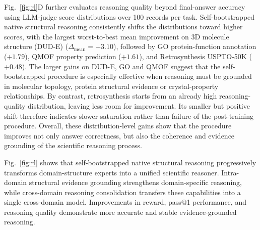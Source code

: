 Fig.~\ref{fig:rl}D further evaluates reasoning quality beyond final-answer accuracy using LLM-judge score distributions over 100 records per task. Self-bootstrapped native structural reasoning consistently shifts the distributions toward higher scores, with the largest worst-to-best mean improvement on 3D molecule structure (DUD-E) ($\Delta_{\mathrm{mean}}=+3.10$), followed by GO protein-function annotation ($+1.79$), QMOF property prediction ($+1.61$), and Retrosynthesis USPTO-50K ($+0.48$). 
The larger gains on DUD-E, GO and QMOF suggest that the self-bootstrapped procedure is especially effective when reasoning must be grounded in molecular topology, protein structural evidence or crystal-property relationships. By contrast, retrosynthesis starts from an already high reasoning-quality distribution, leaving less room for improvement. Its smaller but positive shift therefore indicates slower saturation rather than failure of the post-training procedure. Overall, these distribution-level gains show that the procedure improves not only answer correctness, but also the coherence and evidence grounding of the scientific reasoning process.

Fig.~\ref{fig:rl} shows that self-bootstrapped native structural reasoning progressively transforms domain-structure experts into a unified scientific reasoner. Intra-domain structural evidence grounding strengthens domain-specific reasoning, while cross-domain reasoning consolidation transfers these capabilities into a single cross-domain model. Improvements in reward, pass@1 performance, and reasoning quality demonstrate more accurate and stable evidence-grounded reasoning.

